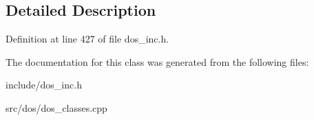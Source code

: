 \subsection{Detailed Description}


Definition at line 427 of file dos\-\_\-inc.\-h.



The documentation for this class was generated from the following files\-:\begin{DoxyCompactItemize}
\item 
include/dos\-\_\-inc.\-h\item 
src/dos/dos\-\_\-classes.\-cpp\end{DoxyCompactItemize}
